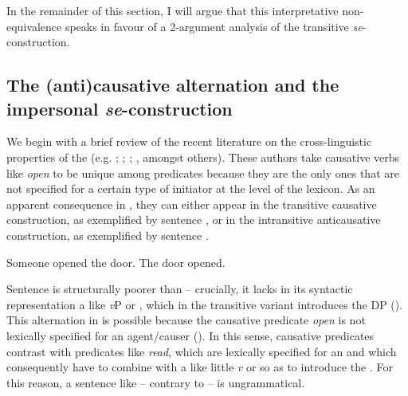 \documentclass[output=paper,nonflat,newtxmath]{langsci/langscibook}
\begin{document}
\noindent In the remainder of this section, I will argue that this interpretative non-equiv\-a\-lence speaks in favour of a 2-argument analysis of the transitive  \textit{se}-construction.

\subsection{The (anti)causative alternation and the impersonal \textit{se}-construction}

We begin with a brief review of the recent literature on the cross-linguistic properties of the  (e.g. \citealt{hovav1995}; \citealt{alexiadou2010}; \citealt{alexiadouet2015}; \citealt{schaffer2017}, amongst others). These authors take causative verbs like \textit{open} to be   unique among predicates because they are the only ones that are not specified for a certain type of initiator at the level of the lexicon. As an apparent consequence in , they can either appear in the transitive causative construction, as exemplified by sentence , or in the intransitive anticausative construction, as exemplified by sentence .

\begin{exe}
\ex
\begin{xlist}
\ex \label{soop} Someone opened the door.
\ex \label{thdo} The door opened.
\end{xlist}
\end{exe}

\noindent Sentence  is structurally poorer than  -- crucially, it lacks in its syntactic representation a  like \textit{v}P or , which in the transitive variant  introduces the  DP (\citealt{kratzer1996}).  This alternation in  is possible because the causative predicate \textit{open} is not lexically specified for an agent/causer (\citealt{alexiadouet2015}). In this sense, causative predicates contrast with predicates like \textit{read}, which are lexically specified for an  and which consequently have to combine with a  like little \textit{v} or  so as to introduce the . For this reason, a sentence like  -- contrary to  -- is ungrammatical.

\begin{exe}
 \label{thbo}
\end{exe}
\end{document}
